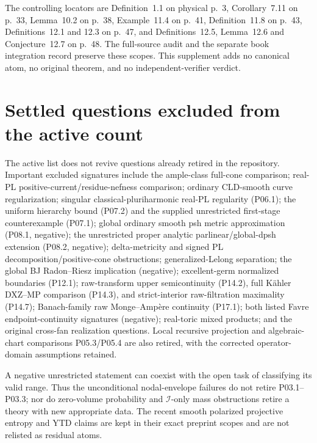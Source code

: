 \documentclass[11pt,a4paper]{article}
\theoremstyle{definition}
\theoremstyle{remark}
\begin{document}
The controlling locators are Definition~1.1 on physical p.~3,
Corollary~7.11 on p.~33, Lemma~10.2 on p.~38,
Example~11.4 on p.~41, Definition~11.8 on p.~43,
Definitions~12.1 and 12.3 on p.~47, and Definitions~12.5,
Lemma~12.6 and Conjecture~12.7 on p.~48. The full-source audit and
the separate book integration record preserve these scopes.
This supplement adds no canonical atom, no original theorem, and no
independent-verifier verdict.

\section*{Settled questions excluded from the active count}
The active list does not revive questions already retired in the repository.
Important excluded signatures include the ample-class full-cone comparison;
real-PL positive-current/residue-nefness comparison; ordinary CLD-smooth
curve regularization; singular classical-pluriharmonic real-PL regularity
(P06.1); the uniform hierarchy bound (P07.2) and the supplied unrestricted
first-stage counterexample (P07.1); global ordinary smooth psh metric
approximation (P08.1, negative); the unrestricted proper analytic
parlinear/global-dpsh extension (P08.2, negative); delta-metricity and signed
PL decomposition/positive-cone obstructions; generalized-Lelong separation;
the global BJ Radon--Riesz implication (negative); excellent-germ normalized
boundaries (P12.1); raw-transform upper semicontinuity (P14.2), full
K\"ahler DXZ--MP comparison (P14.3), and strict-interior raw-filtration
maximality (P14.7); Banach-family raw Monge--Ampère continuity (P17.1);
both listed Favre endpoint-continuity signatures (negative); real-toric
mixed products; and the original cross-fan realization questions.
Local recursive projection and algebraic-chart comparisons P05.3/P05.4
are also retired, with the corrected operator-domain assumptions retained.

A negative unrestricted statement can coexist with the open task of
classifying its valid range. Thus the unconditional nodal-envelope failures
do not retire P03.1--P03.3; nor do zero-volume probability and
\(\mathcal I\)-only mass obstructions retire a theory with new appropriate
data. The recent smooth polarized projective entropy and YTD claims are
kept in their exact preprint scopes and are not relisted as residual atoms.
\end{document}

